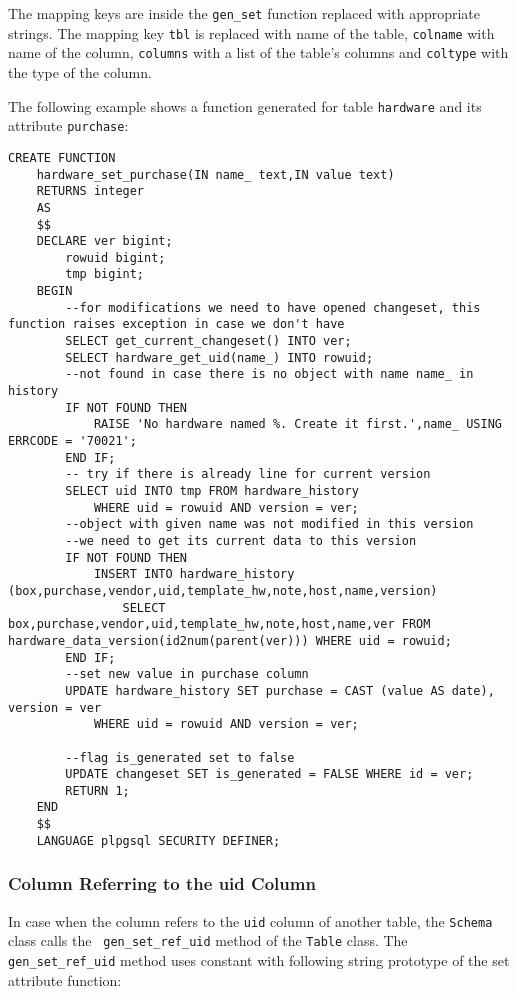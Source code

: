 \documentclass[deska]{subfiles}
\begin{document}
The mapping keys are inside the {\tt gen\_set} function replaced with appropriate strings. The mapping key {\tt tbl} is
replaced with name of the table, {\tt colname} with name of the column, {\tt columns} with a list of the table's columns
and {\tt coltype} with the type of the column.

The following example shows a function generated for table {\tt hardware} and its attribute {\tt purchase}:

\begin{verbatim}
CREATE FUNCTION
    hardware_set_purchase(IN name_ text,IN value text)
    RETURNS integer
    AS
    $$
    DECLARE ver bigint;
        rowuid bigint;
        tmp bigint;
    BEGIN
        --for modifications we need to have opened changeset, this function raises exception in case we don't have
        SELECT get_current_changeset() INTO ver;
        SELECT hardware_get_uid(name_) INTO rowuid;
        --not found in case there is no object with name name_ in history
        IF NOT FOUND THEN
            RAISE 'No hardware named %. Create it first.',name_ USING ERRCODE = '70021';
        END IF;
        -- try if there is already line for current version
        SELECT uid INTO tmp FROM hardware_history
            WHERE uid = rowuid AND version = ver;
        --object with given name was not modified in this version
        --we need to get its current data to this version
        IF NOT FOUND THEN
            INSERT INTO hardware_history (box,purchase,vendor,uid,template_hw,note,host,name,version)
                SELECT box,purchase,vendor,uid,template_hw,note,host,name,ver FROM hardware_data_version(id2num(parent(ver))) WHERE uid = rowuid;
        END IF;
        --set new value in purchase column
        UPDATE hardware_history SET purchase = CAST (value AS date), version = ver
            WHERE uid = rowuid AND version = ver;

        --flag is_generated set to false
        UPDATE changeset SET is_generated = FALSE WHERE id = ver;
        RETURN 1;
    END
    $$
    LANGUAGE plpgsql SECURITY DEFINER;

\end{verbatim}

\subsubsection{Column Referring to the uid Column}

In case when the column refers to the {\tt uid} column of another table, the {\tt Schema} class calls the {\tt
gen\_set\_ref\_uid} method of the {\tt Table} class. The {\tt gen\_set\_ref\_uid} method uses constant with following
string prototype of the set attribute function:
\end{document}
